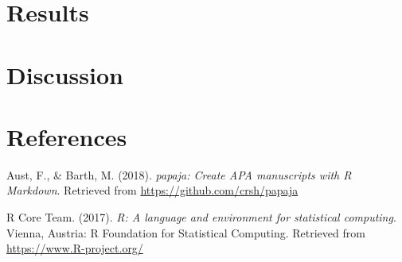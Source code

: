 \documentclass[man]{apa6}
\theoremstyle{definition}
\theoremstyle{definition}
\theoremstyle{definition}
\theoremstyle{remark}
\begin{document}
\section{Results}\label{results}

\section{Discussion}\label{discussion}

\newpage

\section{References}\label{references}

\begingroup
\setlength{\parindent}{-0.5in} \setlength{\leftskip}{0.5in}

\hypertarget{refs}{}
\hypertarget{ref-R-papaja}{}
Aust, F., \& Barth, M. (2018). \emph{papaja: Create APA manuscripts with
R Markdown}. Retrieved from \url{https://github.com/crsh/papaja}

\hypertarget{ref-R-base}{}
R Core Team. (2017). \emph{R: A language and environment for statistical
computing}. Vienna, Austria: R Foundation for Statistical Computing.
Retrieved from \url{https://www.R-project.org/}

\endgroup
\end{document}
